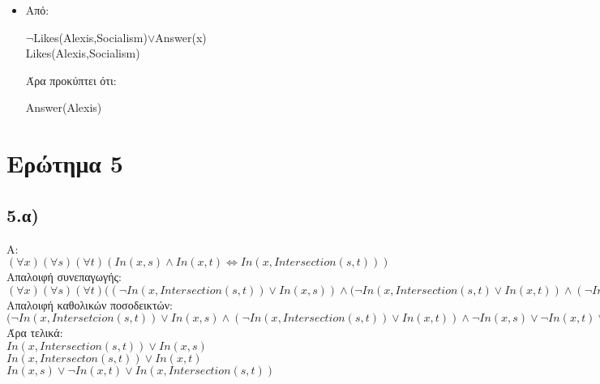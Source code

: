 \documentclass[12pt,a4paper]{article}
\begin{document}
\begin{itemize}
\begin{center}
\end{center}
Προκύπτει ότι:\begin{center}
\textlatin{$\neg$Likes(Alexis,Socialism)$\vee\neg$Likes(Alexis,Socialism)$\vee$Answer(x)}
\end{center}
Άρα:\begin{center}
\textlatin{$\neg$Likes(Alexis,Socialism)$\vee$Answer(x)}
\end{center}
\item Από: \begin{center}
\textlatin{$\neg$Likes(Alexis,Socialism)$\vee$Answer(x)\\
Likes(Alexis,Socialism)}
\end{center}
Άρα προκύπτει ότι:\begin{center}
\textlatin{Answer(Alexis)}
\end{center}
\end{itemize}



\section*{Ερώτημα 5}

\subsection*{5.α)}
Α:\\
$(\forall x)(\forall s)(\forall t)(In(x,s)\wedge In(x,t) \Leftrightarrow In(x,Intersection(s,t)))$\\
Απαλοιφή συνεπαγωγής:\vspace{1mm}\\
$(\forall x)(\forall s)(\forall t)((\neg In(x,Intersection(s,t))\vee In(x,s))\wedge(\neg In(x,Intersection(s,t)\vee In(x,t))\wedge (\neg In(x,s)\vee\neg In(x,t)\vee In(x,Intersection(s,t)))$\\
Απαλοιφή καθολικών ποσοδεικτών:\vspace{1mm}\\
$(\neg In(x,Intersetcion(s,t))\vee In(x,s)\wedge (\neg In(x,Intersection(s,t))\vee In(x,t))\wedge\neg In(x,s) \vee\neg In(x,t)\vee In(x,Intersection(s,t))$\\
Άρα τελικά:\vspace{1mm}\\
$In(x,Intersection(s,t))\vee In(x,s)$\\
$In(x,Intersecton(s,t))\vee In(x,t)$\\
$In(x,s)\vee\neg In(x,t) \vee In(x,Intersection(s,t))$\vspace{1mm}\\
\end{document}
